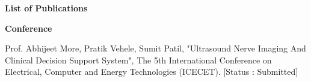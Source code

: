\documentclass[12pt]{article}
\begin{document}
\justifying
\noindent


\newpage
\begin{flushleft}
{\Large \textbf{List of Publications}}\\[0.6cm]
\end{flushleft}
 \textbf{Conference}

\vspace{20pt}

\noindent Prof. Abhijeet More, Pratik Vehele, Sumit Patil, "Ultrasound Nerve Imaging And Clinical Decision Support System", The 5th International Conference on Electrical, Computer and Energy Technologies (ICECET).  [Status : Submitted]
\end{document}
